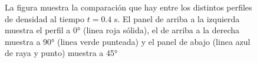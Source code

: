 \documentclass[12pt,a4paper]{book}
\begin{document}
\begin{figure}
  \centering
    \caption{La figura muestra la comparación que hay entre los distintos perfiles de
    densidad al tiempo $t = 0.4$ s. El panel de arriba a la izquierda muestra el perfil a 0° (linea roja
    sólida), el de arriba a la derecha muestra a 90° (linea verde punteada) y el panel de abajo 
    (linea azul de raya y punto) muestra a 45°}
    \label{fig:comparacion_perfil_radial}
\end{figure}
\end{document}
